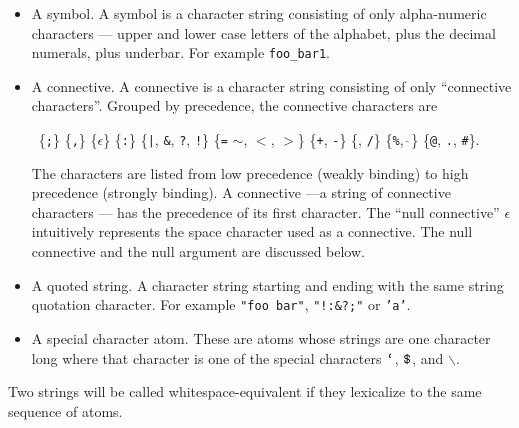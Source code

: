 \documentclass{article}
\newcommand{\mtt}[1]{\mbox{\tt #1}}
\begin{document}
\begin{itemize}
\item A symbol.  A symbol is a character string consisting of only alpha-numeric characters --- upper and lower case letters of the alphabet, plus the decimal numerals, plus underbar.
  For example {\tt foo\_bar1}.
\item A connective.  A connective is a character string consisting of only ``connective characters''.
  Grouped by precedence, the connective characters are
  
  \medskip
  \centerline{~\;\;\;\;\;\;\{\mtt{;}\} \{\mtt{,}\} \{$\epsilon$\}  \{\mtt{:}\}
  \{{\tt |}, {\tt \&}, {\tt ?}, {\tt !}\} \{{\tt =} {\tt $\sim$}, {\tt $<$}, {\tt $>$}\} \{{\tt +}, {\tt -}\}
  \{{\tt *}, {\tt /}\} \{{\tt \%}, $\hat{~}$\} \{{\tt @}, {\tt .}, {\tt \#}\}.}
  
  \medskip
  The characters are listed from low precedence (weakly binding) to high precedence (strongly binding). A connective
  ---a string of connective characters --- has the precedence of its first character.  The ``null connective'' $\epsilon$
  intuitively represents the space character used as a connective.  The null connective and the null argument are discussed below.
\item A quoted string.  A character string starting and ending with the same string quotation character.  For example {\tt "foo bar"}, {\tt "!:\&?;"} or {\tt 'a'}.
\item A special character atom. These are atoms whose strings are one character long where that character is one of
  the special characters $\mtt{`}$, $\mtt{\$}$, and $\backslash$.
\end{itemize}

Two strings will be called whitespace-equivalent if they lexicalize to the same sequence of atoms.

\newcommand{\sym}{\mathrm{SYM}}
\newcommand{\conn}{\mathrm{CONN}}
\newcommand{\quot}{\mathrm{QUOTE}}
\newcommand{\misc}{\mathrm{MISC}}
\newcommand{\app}{\mathrm{APP}}
\newcommand{\var}{\mathrm{VAR}}
\end{document}
